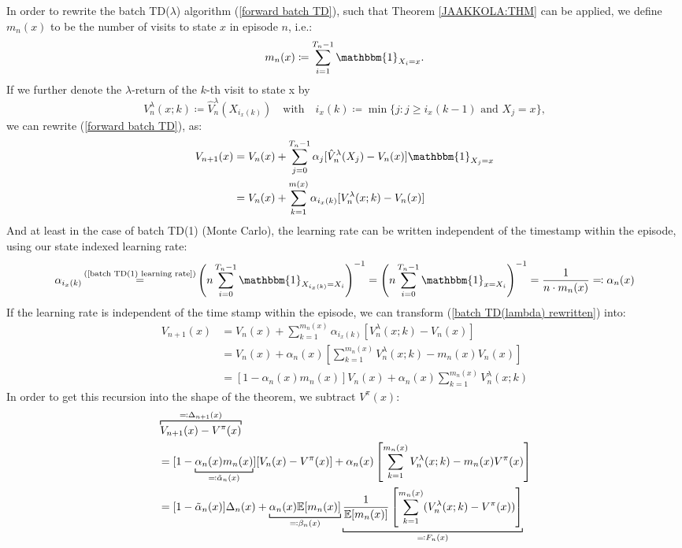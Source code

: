 In order to rewrite the batch TD(\(\lambda\)) algorithm (\ref{forward batch TD}), such that Theorem \ref{JAAKKOLA:THM} can be applied, we define \(m_n(x)\) to be the number of visits to state \(x\) in episode \(n\), i.e.:
\[
    m_n(x)\coloneqq \sum_{i=1}^{T_n-1} \mathbbm{1}_{X_i=x}.
\]
If we further denote the \(\lambda\)-return of the \(k\)-th visit to state x by
\[
    V_n^\lambda(x;k)\coloneqq \hat{V}^\lambda_n(X_{i_x(k)}) \quad \text{with}\quad i_x(k)\coloneqq \min\{j: j\ge i_x(k-1) \text{ and } X_j=x\},
\]
we can rewrite (\ref{forward batch TD}), as:
\begin{align}
    V_{n+1}(x)
    &=V_n(x)+\sum_{j=0}^{T_n-1}\alpha_j [\hat{V}_n^\lambda(X_j)-V_n(x)]\mathbbm{1}_{X_j=x}
    \nonumber \\
    &=V_n(x)+\sum_{k=1}^{m(x)} \alpha_{i_x(k)}[V_n^\lambda(x;k)-V_n(x)] \label{batch TD(lambda) rewritten}
\end{align}
And at least in the case of batch TD(1) (Monte Carlo), the learning rate can be written independent of the timestamp within the episode, using our state indexed learning rate:
\[
    \alpha_{i_x(k)}
    \xeq{\text{(\ref{batch TD(1) learning rate})}} \left(n\sum_{i=0}^{T_n-1}\mathbbm{1}_{X_{i_x(k)}=X_i} \right)^{-1}
    = \left(n\sum_{i=0}^{T_n-1}\mathbbm{1}_{x=X_i} \right)^{-1}=\frac{1}{n\cdot m_n(x)}
    \eqqcolon \alpha_n(x)
\]
If the learning rate is independent of the time stamp within the episode, we can transform (\ref{batch TD(lambda) rewritten}) into:
\begin{align*}
    V_{n+1}(x)
    &=V_n(x)+\sum_{k=1}^{m_n(x)} \alpha_{i_x(k)}[V_n^\lambda(x;k)-V_n(x)]\\
    &=V_n(x)+\alpha_n(x)\left[\sum_{k=1}^{m_n(x)}V_n^\lambda(x;k) - m_n(x) V_n(x)\right]\\
    &=[1-\alpha_n(x)m_n(x)]V_n(x)+\alpha_n(x)\sum_{k=1}^{m_n(x)}V_n^\lambda(x;k)
\end{align*}
In order to get this recursion into the shape of the theorem, we subtract \(V^\pi(x)\):
\begin{align*}
    &\overbracket[0.7pt]{V_{n+1}(x)-V^\pi(x)}^{\eqqcolon \Delta_{n+1}(x)}\\
    &= [1-\underbracket[0.7pt]{\alpha_n(x)m_n(x)}_{\eqqcolon \tilde{\alpha}_n(x)}][V_n(x)-V^\pi(x)]
    + \alpha_n(x)\left[\sum_{k=1}^{m_n(x)}V_n^\lambda(x;k) -m_n(x) V^\pi(x)\right]\\
    &=[1-\tilde{\alpha}_n(x)]\Delta_n(x)
        +\underbracket[0.7pt]{\alpha_n(x)\E[m_n(x)]}_{\eqqcolon \beta_n(x)}\underbracket[0.7pt]{
            \frac{1}{\E[m_n(x)]}\left[\sum_{k=1}^{m_n(x)}(V_n^\lambda(x;k) - V^\pi(x))\right]
        }_{
            \eqqcolon F_n(x)
        }
\end{align*}
